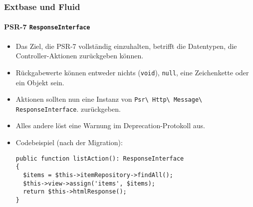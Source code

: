 %

\begin{frame}[fragile]
	\frametitle{Extbase und Fluid}
	\framesubtitle{PSR-7 \texttt{ResponseInterface}}


	\begin{itemize}
		\item Das Ziel, die PSR-7 vollständig einzuhalten, betrifft die Datentypen,
			die Controller-Aktionen zurückgeben können.
		\item Rückgabewerte können entweder nichts (\small\texttt{void}\normalsize),
			\small\texttt{null}\normalsize, eine Zeichenkette oder ein Objekt sein.
		\item Aktionen sollten nun eine Instanz von
			\smaller\texttt{Psr\textbackslash
				Http\textbackslash
				Message\textbackslash
				ResponseInterface}.\normalsize
				zurückgeben.
		\item Alles andere löst eine Warnung im Deprecation-Protokoll aus.
		\item Codebeispiel (nach der Migration):
\begin{lstlisting}
public function listAction(): ResponseInterface
{
  $items = $this->itemRepository->findAll();
  $this->view->assign('items', $items);
  return $this->htmlResponse();
}
\end{lstlisting}

	\end{itemize}

\end{frame}

